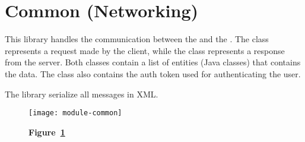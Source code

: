 \section{Common (Networking)}\label{sec:common}

This library handles the communication between the  and the
. The  class represents a request made by the
client, while the  class represents a response from the
server. Both classes contain a list of entities (Java classes) that contains the
data. The  class also contains the auth token used for
authenticating the user.

The library serialize all messages in XML\@.

\begin{landscape}
	\begin{figure}[!h]
		\texttt{[image: module-common]}
		\caption*{\textbf{Figure~\ref{fig:common}}}
		\captionlistentry{}\label{fig:common}
	\end{figure}
\end{landscape}
